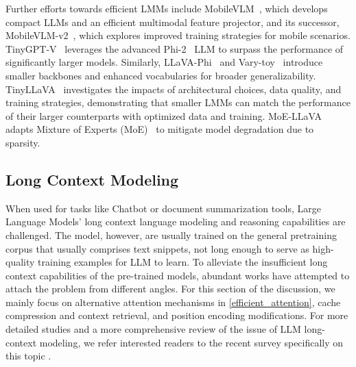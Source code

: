 Further efforts towards efficient LMMs include MobileVLM~\citep{chu2023mobilevlm}, which develops compact LLMs and an efficient multimodal feature projector, and its successor, MobileVLM-v2~\citep{chu2024mobilevlm}, which explores improved training strategies for mobile scenarios. TinyGPT-V~\citep{yuan2023tinygpt} leverages the advanced Phi-2~\citep{javaheripi2023phi} LLM to surpass the performance of significantly larger models. 
Similarly, LLaVA-Phi~\citep{zhu2024llava} and Vary-toy~\citep{wei2024small} introduce smaller backbones and enhanced vocabularies for broader generalizability. 
TinyLLaVA~\citep{zhou2024tinyllava} investigates the impacts of architectural choices, data quality, and training strategies, demonstrating that smaller LMMs can match the performance of their larger counterparts with optimized data and training. MoE-LLaVA~\citep{lin2024moe} adapts Mixture of Experts (MoE)~\citep{6215056} to mitigate model degradation due to sparsity. 


\subsection{Long Context Modeling} 
When used for tasks like Chatbot or document summarization tools, Large Language Models' long context language modeling and reasoning capabilities are challenged. The model, however, are usually trained on the general pretraining corpus that usually comprises text snippets, not long enough to serve as high-quality training examples for LLM to learn. To alleviate the insufficient long context capabilities of the pre-trained models, abundant works have attempted to attach the problem from different angles. For this section of the discussion, we mainly focus on alternative attention mechanisms in \ref{efficient_attention}, cache compression and context retrieval, and position encoding modifications. For more detailed studies and a more comprehensive review of the issue of LLM long-context modeling, we refer interested readers to the recent survey specifically on this topic \cite{huang2023advancing}. 

